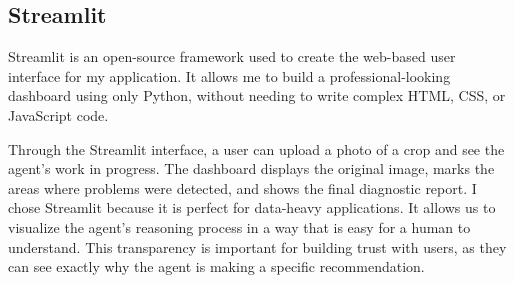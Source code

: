 \subsection{Streamlit}
Streamlit is an open-source framework used to create the web-based user interface for my application. It allows me to build a professional-looking dashboard using only Python, without needing to write complex HTML, CSS, or JavaScript code.

Through the Streamlit interface, a user can upload a photo of a crop and see the agent's work in progress. The dashboard displays the original image, marks the areas where problems were detected, and shows the final diagnostic report. I chose Streamlit because it is perfect for data-heavy applications. It allows us to visualize the agent's reasoning process in a way that is easy for a human to understand. This transparency is important for building trust with users, as they can see exactly why the agent is making a specific recommendation.

%
%
%
%
